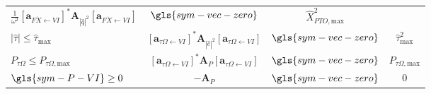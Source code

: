 \documentclass[a4paper,fleqn,colorlinks,unicode,lineno]{cas-dc} %
\makeatletter
\providecommand{\DIFaddtex}[1]{{\protect\color{blue}\uwave{#1}}} %
\providecommand{\DIFdeltex}[1]{{\protect\color{red}\sout{#1}}} %
\providecommand{\DIFaddFL}[1]{\DIFadd{#1}} %
\providecommand{\DIFdelFL}[1]{\DIFdel{#1}} %
\providecommand{\DIFaddbeginFL}{} %
\providecommand{\DIFaddendFL}{} %
\providecommand{\DIFdelbeginFL}{} %
\providecommand{\DIFdelendFL}{} %
\providecommand{\DIFadd}[1]{\texorpdfstring{\DIFaddtex{#1}}{#1}} %
\providecommand{\DIFdel}[1]{\texorpdfstring{\DIFdeltex{#1}}{}} %
\providecommand{\DIFscaledelfig}{0.5}
\newlength{\DIFdelgraphicswidth} %
\newlength{\DIFdelgraphicsheight} %
\providecommand{\DIFaddincludegraphics}[2][]{{\color{blue}\fbox{\DIFOincludegraphics[#1]{#2}}}} %
\providecommand{\DIFdelincludegraphics}[2][]{%
\sbox{\DIFdelgraphicsbox}{\DIFOincludegraphics[#1]{#2}}%
\settoboxwidth{\DIFdelgraphicswidth}{\DIFdelgraphicsbox} %
\settoboxtotalheight{\DIFdelgraphicsheight}{\DIFdelgraphicsbox} %
\scalebox{\DIFscaledelfig}{%
\parbox[b]{\DIFdelgraphicswidth}{\usebox{\DIFdelgraphicsbox}\\[-\baselineskip] \rule{\DIFdelgraphicswidth}{0em}}\llap{\resizebox{\DIFdelgraphicswidth}{\DIFdelgraphicsheight}{%
\setlength{\unitlength}{\DIFdelgraphicswidth}%
\begin{picture}(1,1)%
\thicklines\linethickness{2pt} %
{\color[rgb]{1,0,0}\put(0,0){\framebox(1,1){}}}%
{\color[rgb]{1,0,0}\put(0,0){\line( 1,1){1}}}%
{\color[rgb]{1,0,0}\put(0,1){\line(1,-1){1}}}%
\end{picture}%
}\hspace*{3pt}}} %
} %
\DeclareRobustCommand{\DIFaddbeginFL}{\DIFOaddbeginFL \let\includegraphics\DIFaddincludegraphics} %
\DeclareRobustCommand{\DIFaddendFL}{\DIFOaddendFL \let\includegraphics\DIFOincludegraphics} %
\DeclareRobustCommand{\DIFdelbeginFL}{\DIFOdelbeginFL \let\includegraphics\DIFdelincludegraphics} %
\DeclareRobustCommand{\DIFdelendFL}{\DIFOaddendFL \let\includegraphics\DIFOincludegraphics} %
\let\sout@orig\sout %
\renewcommand{\sout}[1]{\ifmmode\text{\sout@orig{\ensuremath{#1}}}\else\sout@orig{#1}\fi} %
\makeatother
\begin{document}
\begin{table}[b!]
\begin{tabular}{lccc}
        \DIFdelbeginFL \DIFdelFL{$\frac{1}{\omega^2}
        [\mathbf{a}_{F\dot{X}\leftarrow VI}]^* 
        \mathbf{A}_{|\hat{q}|^2}
        [\mathbf{a}_{F\dot{X}\leftarrow VI}]$ }\DIFdelendFL \DIFaddbeginFL \DIFaddFL{$\frac{1}{\gls{sym-omega}^2}
        [\gls{sym-mathbf-a-F-dot-X-leftarrow-VI}]^*
        \gls{sym-mathbf-Q-hat-q-2}
        [\gls{sym-mathbf-a-F-dot-X-leftarrow-VI}]$ }\DIFaddendFL &
        $\gls{sym-vec-zero}$  & \DIFdelbeginFL \DIFdelFL{$\hat{X}_{PTO,\text{max}}^2$ }\DIFdelendFL \DIFaddbeginFL \DIFaddFL{$\gls{sym-X-PTO-max}^2$ }\DIFaddendFL \\
    \DIFdelbeginFL \DIFdelFL{$|\hat{\tau}| \leq \hat{\tau}_{\text{max}}$ }\DIFdelendFL \DIFaddbeginFL \DIFaddFL{$|\gls{sym-hat-tau}| \leq \gls{sym-tau-max}$ }\DIFaddendFL &
        \DIFdelbeginFL \DIFdelFL{$[\mathbf{a}_{\tau\Omega \leftarrow VI}]^* 
        \mathbf{A}_{|\hat{e}|^2}
        [\mathbf{a}_{\tau\Omega\leftarrow VI}]$ }\DIFdelendFL \DIFaddbeginFL \DIFaddFL{$[\gls{sym-mathbf-a-tau-Omega-leftarrow-VI}]^*
        \gls{sym-mathbf-Q-hat-e-2}
        [\gls{sym-mathbf-a-tau-Omega-leftarrow-VI}]$ }\DIFaddendFL &
        $\gls{sym-vec-zero}$  & \DIFdelbeginFL \DIFdelFL{$\hat{\tau}_{\text{max}}^2$ }\DIFdelendFL \DIFaddbeginFL \DIFaddFL{$\gls{sym-tau-max}^2$ }\DIFaddendFL \\
    \DIFdelbeginFL \DIFdelFL{$P_{\tau\Omega} \leq P_{\tau\Omega,\text{max}}$ }\DIFdelendFL \DIFaddbeginFL \DIFaddFL{$\gls{sym-P-tau-Omega} \leq \gls{sym-P-tau-Omega-max}$ }\DIFaddendFL &
        \DIFdelbeginFL \DIFdelFL{$[\mathbf{a}_{\tau\Omega \leftarrow VI}]^* 
        \mathbf{A}_{P}
        [\mathbf{a}_{\tau\Omega\leftarrow VI}]$ }\DIFdelendFL \DIFaddbeginFL \DIFaddFL{$[\gls{sym-mathbf-a-tau-Omega-leftarrow-VI}]^*
        \gls{sym-mathbf-Q-P}
        [\gls{sym-mathbf-a-tau-Omega-leftarrow-VI}]$ }\DIFaddendFL &
        $\gls{sym-vec-zero}$  & \DIFdelbeginFL \DIFdelFL{$P_{\tau\Omega,\text{max}}$ }\DIFdelendFL \DIFaddbeginFL \DIFaddFL{$\gls{sym-P-tau-Omega-max}$ }\DIFaddendFL \\
    $\gls{sym-P-VI} \geq 0$  &
        \DIFdelbeginFL \DIFdelFL{$-\mathbf{A}_{P}$ }\DIFdelendFL \DIFaddbeginFL \DIFaddFL{$-\gls{sym-mathbf-Q-P}$ }\DIFaddendFL &
        $\gls{sym-vec-zero}$  & $0$ \\
\end{tabular}
\end{table}
\end{document}
